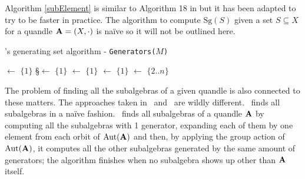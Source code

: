 \newpage\noindent Algorithm \ref{subElement} is similar to Algorithm 18 in \cite{Araujo2022CREAMAP} but it has been adapted to try to be faster in practice.\newline
The algorithm to compute $\text{Sg}(S)$ given a set $S \subseteq X$ for a quandle $\mathbf{A} = (X, \cdot)$ is naïve so it will not be outlined here.\newline\newline
\begin{algorithm}[H]
\DontPrintSemicolon
\caption{\Software's generating set algorithm - \texttt{Generators($M$)} }

\BlankLine
\BlankLine
\subalgebra $\leftarrow$ $\{1\}$\;
\S $\leftarrow$ $\{1\}$\;
\largest $\leftarrow$ $\{1\}$\;
\gentmp $\leftarrow$ $\{1\}$\;
\pgens $\leftarrow$ $\{2..n\}$\;

\end{algorithm}\vspace{0.9em}
\noindent The problem of finding all the subalgebras of a given quandle is also connected to these matters. The approaches taken in \rig~and \cream~are wildly different. \rig~finds all subalgebras in a naïve fashion. \cream~finds all subalgebras of a quandle $\mathbf{A}$ by computing all the subalgebras with 1 generator, expanding each of them by one element from each orbit of $\operatorname{Aut}(\mathbf{A})$ and then, by applying the group action of $\operatorname{Aut}(\mathbf{A})$, it computes all the other subalgebras generated by the same amount of generators; the algorithm finishes when no subalgebra shows up other than $\mathbf{A}$ itself.

